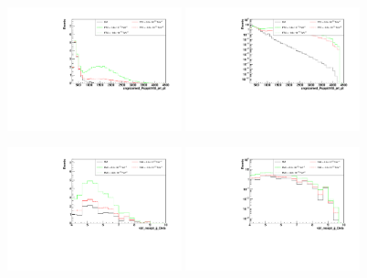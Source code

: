 \begin{figure}[h]
  \begin{center}
	\includegraphics[width=0.45\textwidth]{Plots/aQGC_kinematics/ungroomed_PuppiAK8_jet_pt_FT2.pdf}%
	\includegraphics[width=0.45\textwidth]{Plots/aQGC_kinematics/ungroomed_PuppiAK8_jet_pt_FT2_log.pdf}\\
    \caption{}
  \end{center}
\end{figure}
\begin{figure}[h]
  \begin{center}
	\includegraphics[width=0.45\textwidth]{Plots/aQGC_kinematics/vbf_maxpt_jj_Deta_FM0.pdf}%
	\includegraphics[width=0.45\textwidth]{Plots/aQGC_kinematics/vbf_maxpt_jj_Deta_FM0_log.pdf}\\
    \caption{}
  \end{center}
\end{figure}
